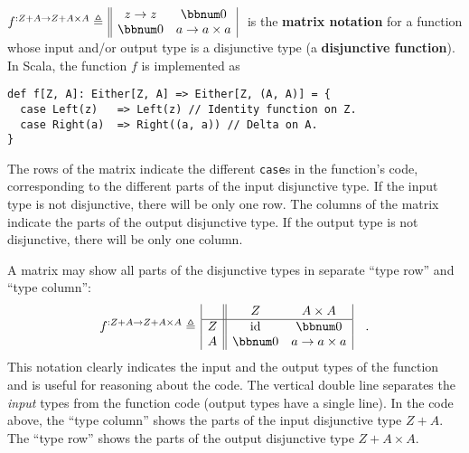 $f^{:Z+A\rightarrow Z+A\times A}\triangleq\,\begin{array}{||cc|}
z\rightarrow z & \bbnum 0\\
\bbnum 0 & a\rightarrow a\times a
\end{array}\,\,$ is the \textbf{matrix notation} for a function
whose input and/or output type is a disjunctive type (a
\textbf{disjunctive function}). In Scala, the function $f$ is implemented
as
\begin{lstlisting}
def f[Z, A]: Either[Z, A] => Either[Z, (A, A)] = {
  case Left(z)   => Left(z) // Identity function on Z.
  case Right(a)  => Right((a, a)) // Delta on A.
}
\end{lstlisting}
The rows of the matrix indicate the different \lstinline!case!s in
the function\textsf{'}s code, corresponding to the different parts of the input
disjunctive type. If the input type is not disjunctive, there will
be only one row. The columns of the matrix indicate the parts of the
output disjunctive type. If the output type is not disjunctive, there
will be only one column.

A matrix may show all parts of the disjunctive types in separate \textsf{``}type
row\textsf{''} and \textsf{``}type column\textsf{''}:
\begin{equation}
f^{:Z+A\rightarrow Z+A\times A}\triangleq\,\begin{array}{|c||cc|}
 & Z & A\times A\\
\hline Z & \text{id} & \bbnum 0\\
A & \bbnum 0 & a\rightarrow a\times a
\end{array}\quad.
\end{equation}
This notation clearly indicates the input and the output types of
the function and is useful for reasoning about the code. The vertical
double line separates the \emph{input} types from the function code
(output types have a single line). In the code above, the \textsf{``}type
column\textsf{''} shows the parts of the input disjunctive type $Z+A$. The
\textsf{``}type row\textsf{''} shows the parts of the output disjunctive type $Z+A\times A$.

